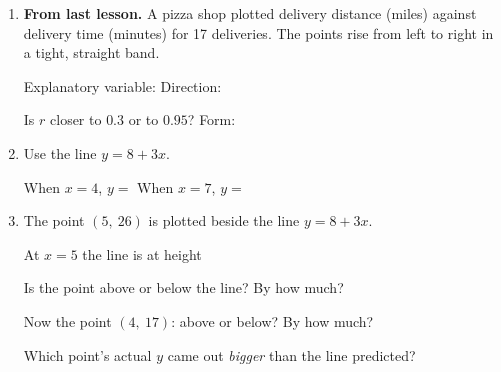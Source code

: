 \documentclass[12pt]{article}
\begin{document}

\vspace{0.28in}

\begin{enumerate}[leftmargin=1.9em, itemsep=1.0in]

  \item \textbf{From last lesson.} A pizza shop plotted delivery distance (miles) against
        delivery time (minutes) for 17 deliveries. The points rise from left to right in a
        tight, straight band.

        \vspace{12pt}
        Explanatory variable:  \qquad Direction: 

        \vspace{16pt}
        Is $r$ closer to $0.3$ or to $0.95$?  \qquad Form: 

  \item Use the line $y = 8 + 3x$.

        \vspace{12pt}
        When $x = 4$, \quad $y =$  \qquad When $x = 7$, \quad $y =$ 

  \item The point $(5,\ 26)$ is plotted beside the line $y = 8 + 3x$.

        \vspace{12pt}
        At $x = 5$ the line is at height 

        \vspace{16pt}
        Is the point above or below the line?  \quad By how much? 

        \vspace{16pt}
        Now the point $(4,\ 17)$: above or below?  \quad By how much? 

        \vspace{16pt}
        Which point's actual $y$ came out \emph{bigger} than the line predicted?\\[18pt]

\end{enumerate}
\end{document}
